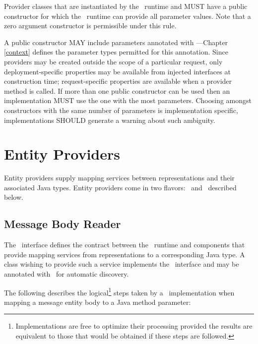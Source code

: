 Provider classes that are instantiated by the \jaxrs\ runtime and MUST have a public constructor for which the \jaxrs\ runtime can provide all parameter values. Note that a zero argument constructor is permissible under this rule.

A public constructor MAY include parameters annotated with \Context ---Chapter \ref{context} defines the parameter types permitted for this annotation. Since providers may be created outside the scope of a particular request, only deployment-specific properties may be available from injected interfaces at construction time; request-specific properties are available when a provider method is called. If more than one public constructor can be used then an implementation MUST use the one with the most parameters. Choosing amongst constructors with the same number of parameters is implementation specific, implementations SHOULD generate a warning about such ambiguity.

\section{Entity Providers}
\label{entity_providers}

Entity providers supply mapping services between representations and their associated Java types. Entity providers come in two flavors: \MsgRead\ and \MsgWrite\ described below. 

\subsection{Message Body Reader}
\label{message_body_reader}

The \MsgRead\ interface defines the contract between the \jaxrs\ runtime and components that provide mapping services from representations to a corresponding Java type. A class wishing to provide such a service implements the \MsgRead\ interface and may be annotated with \Provider\ for automatic discovery.

The following describes the logical\footnote{Implementations are free to optimize their processing provided the results are equivalent to those that would be obtained if these steps are followed.} steps taken by a \jaxrs\ implementation when mapping a message entity body to a Java method parameter:

